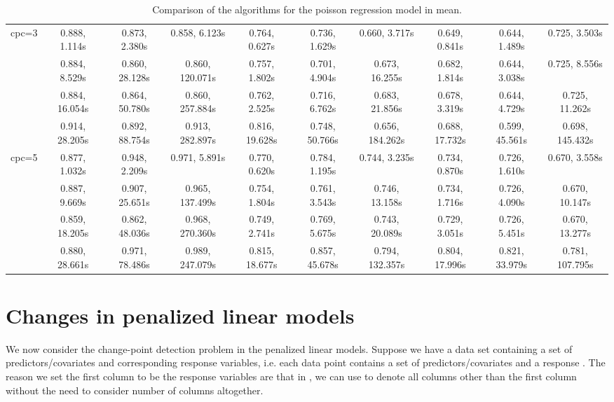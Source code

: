 \documentclass[article]{jss}
\begin{document}
\begin{landscape}
\begin{table}[t!]
\begin{tabular}{@{}cccccccccc@{}}
    \multirow{4}{*}{cpc=3} & 0.888, 1.114s & 0.873, 2.380s & 0.858, 6.123s & 0.764, 0.627s & 0.736, 1.629s & 0.660, 3.717s & 0.649, 0.841s & 0.644, 1.489s & 0.725, 3.503s \\
                           & 0.884, 8.529s & 0.860, 28.128s & 0.860, 120.071s & 0.757, 1.802s & 0.701, 4.904s & 0.673, 16.255s & 0.682, 1.814s & 0.644, 3.038s & 0.725, 8.556s \\
                           & 0.884, 16.054s & 0.864, 50.780s & 0.860, 257.884s & 0.762, 2.525s & 0.716, 6.762s & 0.683, 21.856s & 0.678, 3.319s & 0.644, 4.729s & 0.725, 11.262s \\
                           & 0.914, 28.205s & 0.892, 88.754s & 0.913, 282.897s & 0.816, 19.628s & 0.748, 50.766s & 0.656, 184.262s & 0.688, 17.732s & 0.599, 45.561s & 0.698, 145.432s \\ \midrule
    \multirow{4}{*}{cpc=5} & 0.877, 1.032s & 0.948, 2.209s & 0.971, 5.891s & 0.770, 0.620s & 0.784, 1.195s & 0.744, 3.235s & 0.734, 0.870s & 0.726, 1.610s & 0.670, 3.558s \\
                           & 0.887, 9.669s & 0.907, 25.651s & 0.965, 137.499s & 0.754, 1.804s & 0.761, 3.543s & 0.746, 13.158s & 0.734, 1.716s & 0.726, 4.090s & 0.670, 10.147s \\
                           & 0.859, 18.205s & 0.862, 48.036s & 0.968, 270.360s & 0.749, 2.741s & 0.769, 5.675s & 0.743, 20.089s & 0.729, 3.051s & 0.726, 5.451s & 0.670, 13.277s \\
                           & 0.880, 28.661s & 0.971, 78.486s & 0.989, 247.079s & 0.815, 18.677s & 0.857, 45.678s & 0.794, 132.357s & 0.804, 17.996s & 0.821, 33.979s & 0.781, 107.795s \\ \bottomrule
    \end{tabular}
    \caption{\label{tab:poisson regression comparison} Comparison of the algorithms for the poisson regression model in mean.}
  \end{table}

\end{landscape}
\restoregeometry

\section{Changes in penalized linear models} \label{sec:penalized linear model}

We now consider the change-point detection problem in the penalized linear
models. Suppose we have a data set containing a set of
predictors/covariates and corresponding response variables, i.e. each data point
 contains a set of predictors/covariates  and
a response . The reason we set the first column to be the
response variables are that in , we can use  to denote all
columns other than the first column without the need to consider number of
columns altogether.
\end{document}
